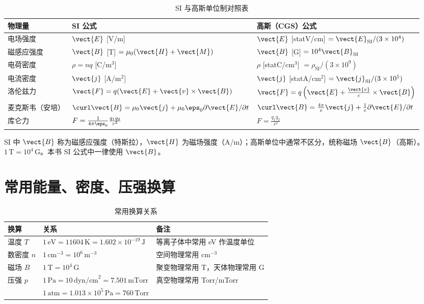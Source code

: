 \begin{table}[htbp]
\centering
\caption{SI 与高斯单位制对照表}
\label{tab:unit-conversion}
\begin{tabular}{@{}p{3.5cm}p{5.5cm}p{5.5cm}@{}}
\toprule
\textbf{物理量} & \textbf{SI 公式} & \textbf{高斯（CGS）公式} \\
\midrule
电场强度 & $\vect{E}$ [V/m] & $\vect{E}$ [statV/cm] $= \vect{E}_\text{SI}/(3\times 10^4)$ \\
磁感应强度 & $\vect{B}$ [T] $=\mu_0(\vect{H}+\vect{M})$ & $\vect{B}$ [G] $= 10^4\vect{B}_\text{SI}$ \\
电荷密度 & $\rho = nq$ [C/m$^3$] & $\rho$ [statC/cm$^3$] $= \rho_\text{SI}/(3\times 10^9)$ \\
电流密度 & $\vect{j}$ [A/m$^2$] & $\vect{j}$ [statA/cm$^2$] $= \vect{j}_\text{SI}/(3\times 10^5)$ \\
洛伦兹力 & $\vect{F}=q(\vect{E}+\vect{v}\times\vect{B})$ & $\vect{F}=q\left(\vect{E}+\frac{\vect{v}}{c}\times\vect{B}\right)$ \\
麦克斯韦（安培） & $\curl\vect{B}=\mu_0\vect{j}+\mu_0\eps_0\partial\vect{E}/\partial t$ & $\curl\vect{B}=\frac{4\pi}{c}\vect{j}+\frac{1}{c}\partial\vect{E}/\partial t$ \\
库仑力 & $F=\frac{1}{4\pi\eps_0}\frac{q_1q_2}{r^2}$ & $F=\frac{q_1q_2}{r^2}$ \\
\bottomrule
\end{tabular}
\end{table}

\begin{warning}[磁感应强度的称呼]
SI 中 $\vect{B}$ 称为磁感应强度（特斯拉），$\vect{H}$ 为磁场强度（A/m）；高斯单位中通常不区分，统称磁场 $\vect{B}$（高斯）。$1\,\text{T} = 10^4\,\text{G}$。本书 SI 公式中一律使用 $\vect{B}$。
\end{warning}


\section{常用能量、密度、压强换算}

\begin{table}[htbp]
\centering
\caption{常用换算关系}
\label{tab:common-conversion}
\begin{tabular}{@{}lll@{}}
\toprule
\textbf{换算} & \textbf{关系} & \textbf{备注} \\
\midrule
温度 $T$ & $1\,\text{eV} = 11604\,\text{K} = 1.602\times 10^{-19}\,\text{J}$ & 等离子体中常用 eV 作温度单位 \\
数密度 $n$ & $1\,\text{cm}^{-3} = 10^6\,\text{m}^{-3}$ & 空间物理常用 cm$^{-3}$ \\
磁场 $B$ & $1\,\text{T} = 10^4\,\text{G}$ & 聚变物理常用 T，天体物理常用 G \\
压强 $p$ & $1\,\text{Pa} = 10\,\text{dyn/cm}^2 = 7.501\,\text{mTorr}$ & 真空物理常用 Torr/mTorr \\
& $1\,\text{atm} = 1.013\times 10^5\,\text{Pa} = 760\,\text{Torr}$ & \\
\bottomrule
\end{tabular}
\end{table}

